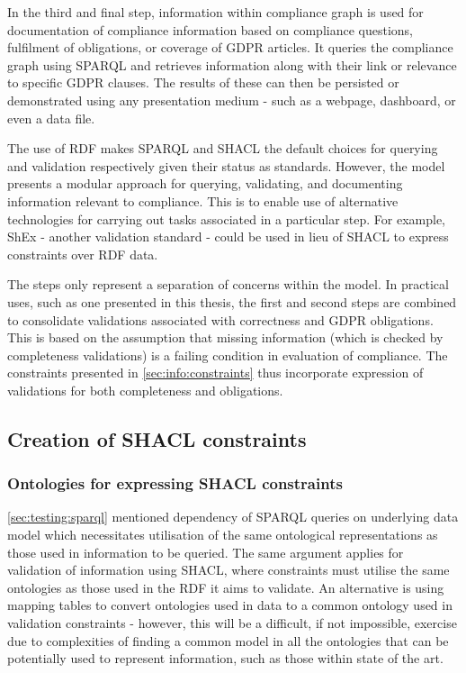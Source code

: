 In the third and final step, information within compliance graph is used for documentation of compliance information based on compliance questions, fulfilment of obligations, or coverage of GDPR articles. It queries the compliance graph using SPARQL and retrieves information along with their link or relevance to specific GDPR clauses.
The results of these can then be persisted or demonstrated using any presentation medium - such as a webpage, dashboard, or even a data file.

The use of RDF makes SPARQL and SHACL the default choices for querying and validation respectively given their status as standards.
However, the model presents a modular approach for querying, validating, and documenting information relevant to compliance. This is to enable use of alternative technologies for carrying out tasks associated in a particular step. 
For example, ShEx - another validation standard - could be used in lieu of SHACL to express constraints over RDF data.

The steps only represent a separation of concerns within the model.
In practical uses, such as one presented in this thesis, the first and second steps are combined to consolidate validations associated with correctness and GDPR obligations.
This is based on the assumption that missing information (which is checked by completeness validations) is a failing condition in evaluation of compliance.
The constraints presented in \autoref{sec:info:constraints} thus incorporate expression of validations for both completeness and obligations.

\subsection{Creation of SHACL constraints}\label{sec:testing:shacl:constraints}
\subsubsection{Ontologies for expressing SHACL constraints}
\autoref{sec:testing:sparql} mentioned dependency of SPARQL queries on underlying data model which necessitates utilisation of the same ontological representations as those used in information to be queried.
The same argument applies for validation of information using SHACL, where constraints must utilise the same ontologies as those used in the RDF it aims to validate.
An alternative is using mapping tables to convert ontologies used in data to a common ontology used in validation constraints - however, this will be a difficult, if not impossible, exercise due to complexities of finding a common model in all the ontologies that can be potentially used to represent information, such as those within state of the art.

